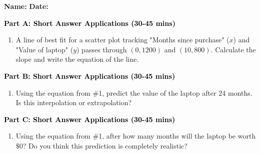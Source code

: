 \documentclass[12pt, letterpaper, fleqn]{article}
\begin{document}
\textbf{Name:} \underline{\hspace{5cm}}
\hfill
\textbf{Date:} \underline{\hspace{3cm}}\\


\begin{tcolorbox}[colback=customteal!20]
\large\textcolor{black}{\textbf{Part A: Short Answer Applications (30-45 mins)}}
\end{tcolorbox}

\vspace{3mm}

\begin{enumerate}[itemsep=4.2cm, leftmargin=0.6cm]
\item A line of best fit for a scatter plot tracking "Months since purchase" ($x$) and "Value of laptop" ($y$) passes through $(0, 1200)$ and $(10, 800)$. Calculate the slope and write the equation of the line.
\end{enumerate}

\newpage

\begin{tcolorbox}[colback=customteal!20]
\large\textcolor{black}{\textbf{Part B: Short Answer Applications (30-45 mins)}}
\end{tcolorbox}

\vspace{3mm}

\begin{enumerate}[itemsep=4.2cm, leftmargin=0.6cm, resume]
\item Using the equation from \#1, predict the value of the laptop after 24 months. Is this interpolation or extrapolation?
\end{enumerate}

\newpage

\begin{tcolorbox}[colback=customteal!20]
\large\textcolor{black}{\textbf{Part C: Short Answer Applications (30-45 mins)}}
\end{tcolorbox}

\vspace{3mm}

\begin{enumerate}[itemsep=4.2cm, leftmargin=0.6cm, resume]
\item Using the equation from \#1, after how many months will the laptop be worth $\$0$? Do you think this prediction is completely realistic?
\end{enumerate}
\end{document}
